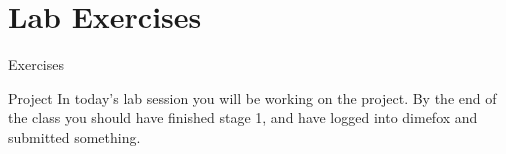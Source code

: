 \documentclass{beamer}
\begin{document}
\section{Lab Exercises}

\begin{frame}{Exercises}
    \begin{block}{Project}
        In today's lab session you will be working on the project. By the
        end of the class you should have finished stage 1, and have logged
        into dimefox and submitted something.
    \end{block}
\end{frame}

%
%
\end{document}
